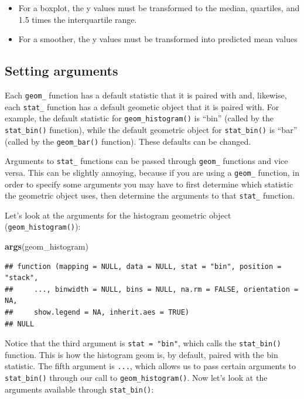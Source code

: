 \documentclass[
]{book}
\newenvironment{Shaded}{\begin{snugshade}}{\end{snugshade}}
\newcommand{\KeywordTok}[1]{\textcolor[rgb]{0.13,0.29,0.53}{\textbf{#1}}}
\newcommand{\NormalTok}[1]{#1}
\providecommand{\tightlist}{%
  \setlength{\itemsep}{0pt}\setlength{\parskip}{0pt}}
\begin{document}
\begin{itemize}
\tightlist
\item
  For a boxplot, the y values must be transformed to the median, quartiles, and 1.5 times the interquartile range.
\item
  For a smoother, the y values must be transformed into predicted mean values
\end{itemize}

\hypertarget{setting-arguments}{%
\subsection{Setting arguments}\label{setting-arguments}}

Each \texttt{geom\_} function has a default statistic that it is paired with and, likewise, each \texttt{stat\_} function has a default geometic object that it is paired with. For example, the default statistic for \texttt{geom\_histogram()} is ``bin'' (called by the \texttt{stat\_bin()} function), while the default geometric object for \texttt{stat\_bin()} is ``bar'' (called by the \texttt{geom\_bar()} function). These defaults can be changed.

Arguments to \texttt{stat\_} functions can be passed through \texttt{geom\_} functions and vice versa. This can be slightly annoying, because if you are using a \texttt{geom\_} function, in order to specify some arguments you may have to first determine which statistic the geometric object uses, then determine the arguments to that \texttt{stat\_} function.

Let's look at the arguments for the histogram geometric object (\texttt{geom\_histogram()}):

\begin{Shaded}
\begin{Highlighting}[]
\KeywordTok{args}\NormalTok{(geom\_histogram)}
\end{Highlighting}
\end{Shaded}

\begin{verbatim}
## function (mapping = NULL, data = NULL, stat = "bin", position = "stack", 
##     ..., binwidth = NULL, bins = NULL, na.rm = FALSE, orientation = NA, 
##     show.legend = NA, inherit.aes = TRUE) 
## NULL
\end{verbatim}

Notice that the third argument is \texttt{stat\ =\ "bin"}, which calls the \texttt{stat\_bin()} function. This is how the histogram geom is, by default, paired with the bin statistic. The fifth argument is \texttt{...}, which allows us to pass certain arguments to \texttt{stat\_bin()} through our call to \texttt{geom\_histogram()}. Now let's look at the arguments available through \texttt{stat\_bin()}:
\end{document}
